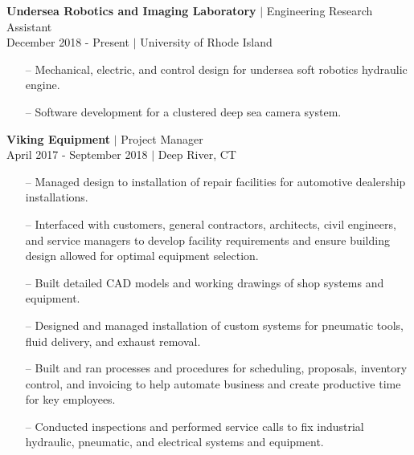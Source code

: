 
{\sc\textbf{Undersea Robotics and Imaging Laboratory} $\vert$  Engineering Research Assistant}\\
{\color{gray} December 2018 - Present $\vert$ University of Rhode Island} \\
\small{
  \begin{itemize}[leftmargin=*]
  \item[--] Mechanical, electric, and control design for undersea soft robotics hydraulic engine.
  \item[--] Software development for a clustered deep sea camera system.
  \end{itemize}
}

\vspace{16pt}

{\sc\textbf{Viking Equipment} $\vert$  Project Manager}\\
{\color{gray} April 2017 - September 2018 $\vert$ Deep River, CT} \\
\small{
  \begin{itemize}[leftmargin=*]
  \item[--] Managed design to installation of repair facilities for automotive dealership installations. %
\item[--] Interfaced with customers, general contractors, architects, civil engineers, and service managers to develop facility requirements and ensure building design allowed for optimal equipment selection.
\item[--] Built detailed CAD models and working drawings of shop systems and equipment.
\item[--] Designed and managed installation of custom systems for pneumatic tools, fluid delivery, and exhaust removal.
\item[--] Built and ran processes and procedures for scheduling, proposals, inventory control, and invoicing to help automate business and create productive time for key employees.
\item[--] Conducted inspections and performed service calls to fix industrial hydraulic, pneumatic, and electrical systems and equipment.
\end{itemize}
}


